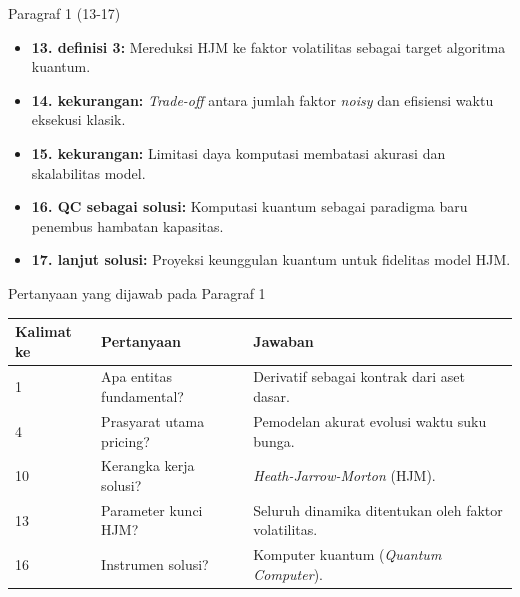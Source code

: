\begin{frame}{Paragraf 1 (13-17)}
    \begin{itemize}
        \item \textbf{13. definisi 3:} Mereduksi HJM ke faktor volatilitas sebagai target algoritma kuantum.
        \item \textbf{14. kekurangan:} \textit{Trade-off} antara jumlah faktor \textit{noisy} dan efisiensi waktu eksekusi klasik.
        \item \textbf{15. kekurangan:} Limitasi daya komputasi membatasi akurasi dan skalabilitas model.
        \item \textbf{16. QC sebagai solusi:} Komputasi kuantum sebagai paradigma baru penembus hambatan kapasitas.
        \item \textbf{17. lanjut solusi:} Proyeksi keunggulan kuantum untuk fidelitas model HJM.
    \end{itemize}
\end{frame}

\begin{frame}{Pertanyaan yang dijawab pada Paragraf 1}
    \centering
    \small
    \begin{tabular}{lp{4.5cm}p{6cm}}
        \toprule
        Kalimat ke & Pertanyaan & Jawaban \\
        \midrule
        1 & Apa entitas fundamental? & Derivatif sebagai kontrak dari aset dasar. \\
        4 & Prasyarat utama pricing? & Pemodelan akurat evolusi waktu suku bunga. \\
        10 & Kerangka kerja solusi? & \textit{Heath-Jarrow-Morton} (HJM). \\
        13 & Parameter kunci HJM? & Seluruh dinamika ditentukan oleh faktor volatilitas. \\
        16 & Instrumen solusi? & Komputer kuantum (\textit{Quantum Computer}). \\
        \bottomrule
    \end{tabular}
\end{frame}

